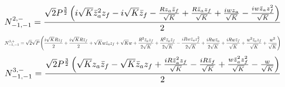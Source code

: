 \documentclass[10pt]{article}
\begin{document}
\begin{equation*}
\resizebox{0.98\textwidth}{!}{${\displaystyle N^{2,-}_{-1,-1}=\frac{\sqrt{2} P^{\frac{3}{2}} \left(i \sqrt{K} \bar z_a^{2} z_f - i \sqrt{K} \bar z_f - \frac{R z_a \bar z_f}{\sqrt{K}} + \frac{R \bar z_a z_f}{\sqrt{K}} + \frac{i w z_a}{\sqrt{K}} - \frac{i w \bar z_a z_f^{2}}{\sqrt{K}}\right)}{2}}$}
\end{equation*}
\begin{equation*}
\resizebox{0.98\textwidth}{!}{${\displaystyle N^{3,+}_{-1,-1}=\sqrt{2} \sqrt{P} \left(\frac{i \sqrt{K} R z_f}{2} + \frac{i \sqrt{K} R \bar z_f}{2} + \sqrt{K} w \bar z_a z_f + \sqrt{K} w + \frac{R^{2} \bar z_a z_f}{2 \sqrt{K}} + \frac{R^{2} \bar z_a \bar z_f}{2 \sqrt{K}} - \frac{i R w \bar z_a z_f^{2}}{2 \sqrt{K}} + \frac{i R w \bar z_a}{2 \sqrt{K}} + \frac{i R w \bar z_f}{\sqrt{K}} + \frac{w^{2} \bar z_a z_f}{\sqrt{K}} + \frac{w^{2}}{\sqrt{K}}\right)}$}
\end{equation*}
\begin{equation*}
\resizebox{0.98\textwidth}{!}{${\displaystyle N^{3,-}_{-1,-1}=\frac{\sqrt{2} P^{\frac{3}{2}} \left(\sqrt{K} z_a \bar z_f - \sqrt{K} \bar z_a z_f + \frac{i R \bar z_a^{2} z_f}{\sqrt{K}} - \frac{i R \bar z_f}{\sqrt{K}} + \frac{w \bar z_a^{2} z_f^{2}}{\sqrt{K}} - \frac{w}{\sqrt{K}}\right)}{2}}$}
\end{equation*}
\end{document}
